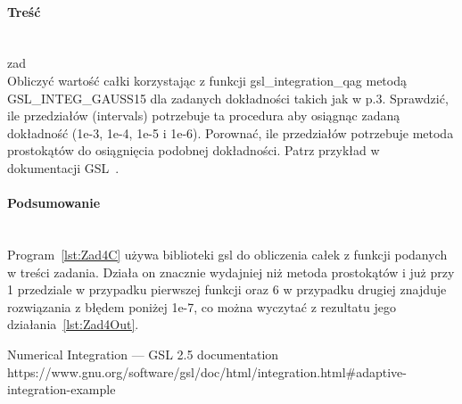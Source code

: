 \paragraph{Treść}~\\
{zad}\\
Obliczyć wartość całki korzystając z funkcji gsl\_integration\_qag metodą GSL\_INTEG\_GAUSS15 dla zadanych dokładności takich jak w p.3.
Sprawdzić, ile przedziałów (intervals) potrzebuje ta procedura aby osiągnąc zadaną dokładność (1e-3, 1e-4, 1e-5 i 1e-6).
Porownać, ile przedziałów potrzebuje metoda prostokątów do osiągnięcia podobnej dokładności.
Patrz przykład w dokumentacji GSL~\cite{NumericalIntegrationGSL25Documentation}.





\paragraph{Podsumowanie}~\\
Program~\ref{lst:Zad4C} używa biblioteki gsl do obliczenia całek z funkcji podanych w treści zadania.
Działa on znacznie wydajniej niż metoda prostokątów i już przy 1 przedziale w przypadku pierwszej funkcji oraz 6 w przypadku drugiej znajduje rozwiązania z błędem poniżej 1e-7, co można wyczytać z rezultatu jego działania~\ref{lst:Zad4Out}.

\begin{thebibliography}{9}
   Numerical Integration — GSL 2.5 documentation https://www.gnu.org/software/gsl/doc/html/integration.html\#adaptive-integration-example
\end{thebibliography}
